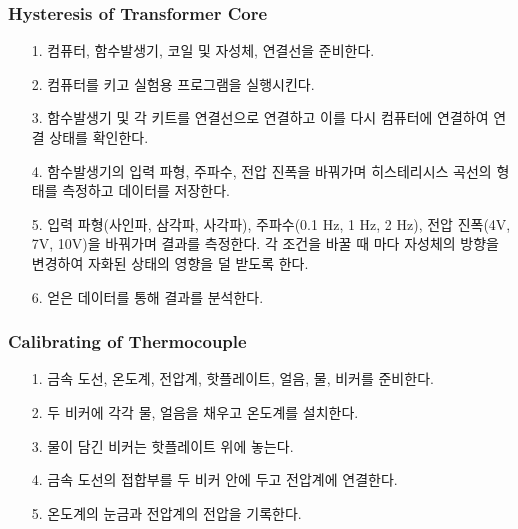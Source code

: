 \documentclass[aps,reprint,superscriptaddress,10pt]{revtex4-2}
\begin{document}
\subsubsection{Hysteresis of Transformer Core}
\begin{itemize}
  \item[1. ] 컴퓨터, 함수발생기, 코일 및 자성체, 연결선을 준비한다.
  \item[2. ] 컴퓨터를 키고 실험용 프로그램을 실행시킨다.
  \item[3. ] 함수발생기 및 각 키트를 연결선으로 연결하고 이를 다시 컴퓨터에 연결하여
  연결 상태를 확인한다.
  \item[4. ] 함수발생기의 입력 파형, 주파수, 전압 진폭을 바꿔가며 히스테리시스 곡선의
  형태를 측정하고 데이터를 저장한다.
  \item[5. ] 입력 파형(사인파, 삼각파, 사각파), 주파수(0.1 Hz, 1 Hz, 2 Hz), 
  전압 진폭(4V, 7V, 10V)을 바꿔가며 결과를 측정한다. 각 조건을 바꿀 때 마다
  자성체의 방향을 변경하여 자화된 상태의 영향을 덜 받도록 한다.
  \item[6. ] 얻은 데이터를 통해 결과를 분석한다.
\end{itemize}
\subsubsection{Calibrating of Thermocouple}
\begin{itemize}
  \item[1. ] 금속 도선, 온도계, 전압계, 핫플레이트, 얼음, 물, 비커를 준비한다.
  \item[2. ] 두 비커에 각각 물, 얼음을 채우고 온도계를 설치한다.
  \item[3. ] 물이 담긴 비커는 핫플레이트 위에 놓는다.
  \item[4. ] 금속 도선의 접합부를 두 비커 안에 두고 전압계에 연결한다.
  \item[5. ] 온도계의 눈금과 전압계의 전압을 기록한다.   
\end{itemize}

\nocite{*} 





\vfill
\end{document}
